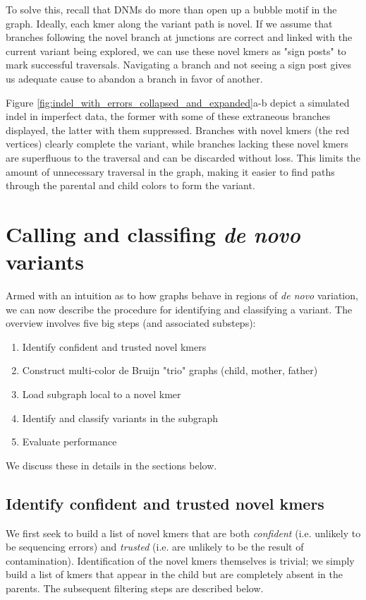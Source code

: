 To solve this, recall that DNMs do more than open up a bubble motif in the graph.  Ideally, each kmer along the variant path is novel.  If we assume that branches following the novel branch at junctions are correct and linked with the current variant being explored, we can use these novel kmers as "sign posts" to mark successful traversals.  Navigating a branch and not seeing a sign post gives us adequate cause to abandon a branch in favor of another.

Figure \ref{fig:indel_with_errors_collapsed_and_expanded}a-b depict a simulated indel in imperfect data, the former with some of these extraneous branches displayed, the latter with them suppressed.  Branches with novel kmers (the red vertices) clearly complete the variant, while branches lacking these novel kmers are superfluous to the traversal and can be discarded without loss.  This limits the amount of unnecessary traversal in the graph, making it easier to find paths through the parental and child colors to form the variant.

\section{Calling and classifing \textit{de novo} variants}

Armed with an intuition as to how graphs behave in regions of \textit{de novo} variation, we can now describe the procedure for identifying and classifying a variant.  The overview involves five big steps (and associated substeps):

\begin{enumerate}
\item Identify confident and trusted novel kmers
\item Construct multi-color de Bruijn "trio" graphs (child, mother, father)
\item Load subgraph local to a novel kmer
\item Identify and classify variants in the subgraph
\item Evaluate performance
\end{enumerate}

We discuss these in details in the sections below.

\subsection{Identify confident and trusted novel kmers}

We first seek to build a list of novel kmers that are both \textit{confident} (i.e. unlikely to be sequencing errors) and \textit{trusted} (i.e. are unlikely to be the result of contamination).  Identification of the novel kmers themselves is trivial; we simply build a list of kmers that appear in the child but are completely absent in the parents.  The subsequent filtering steps are described below.


